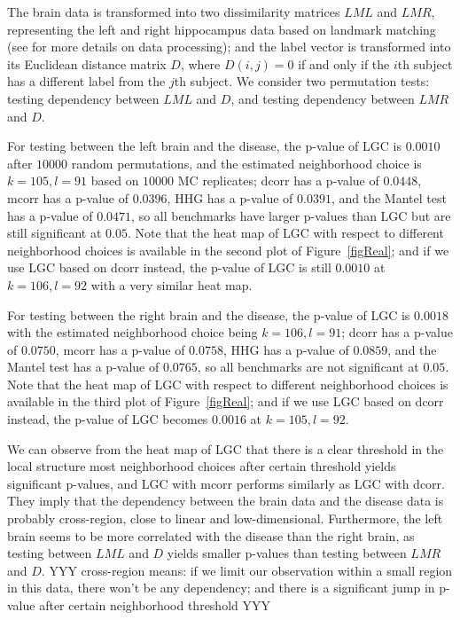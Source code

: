 \documentclass[11pt]{article}
\begin{document}
The brain data is transformed into two dissimilarity matrices $LML$ and $LMR$, representing the left and right hippocampus data based on landmark matching (see \cite{ParkEtAl2011} for more details on data processing); and the label vector is transformed into its Euclidean distance matrix $D$, where $D(i,j)=0$ if and only if the $i$th subject has a different label from the $j$th subject. We consider two permutation tests: testing dependency between $LML$ and $D$, and testing dependency between $LMR$ and $D$.

For testing between the left brain and the disease, the p-value of LGC is $0.0010$ after $10000$ random permutations, and the estimated neighborhood choice is $k=105,l=91$ based on $10000$ MC replicates; dcorr has a p-value of $0.0448$, mcorr has a p-value of $0.0396$, HHG has a p-value of $0.0391$, and the Mantel test has a p-value of $0.0471$, so all benchmarks have larger p-values than LGC but are still significant at $0.05$. Note that the heat map of LGC with respect to different neighborhood choices is available in the second plot of Figure~\ref{figReal}; and if we use LGC based on dcorr instead, the p-value of LGC is still $0.0010$ at $k=106,l=92$ with a very similar heat map.

For testing between the right brain and the disease, the p-value of LGC is $0.0018$ with the estimated neighborhood choice being $k=106,l=91$; dcorr has a p-value of $0.0750$, mcorr has a p-value of $0.0758$, HHG has a p-value of $0.0859$, and the Mantel test has a p-value of $0.0765$, so all benchmarks are not significant at $0.05$. Note that the heat map of LGC with respect to different neighborhood choices is available in the third plot of Figure~\ref{figReal}; and if we use LGC based on dcorr instead, the p-value of LGC becomes $0.0016$ at $k=105,l=92$.

We can observe from the heat map of LGC that there is a clear threshold in the local structure most neighborhood choices after certain threshold yields significant p-values, and LGC with mcorr performs similarly as LGC with dcorr. They imply that the dependency between the brain data and the disease data is probably cross-region, close to linear and low-dimensional. Furthermore, the left brain seems to be more correlated with the disease than the right brain, as testing between $LML$ and $D$ yields smaller p-values than testing between $LMR$ and $D$.
YYY cross-region means: if we limit our observation within a small region in this data, there won't be any dependency; and there is a significant jump in p-value after certain neighborhood threshold YYY
\end{document}
